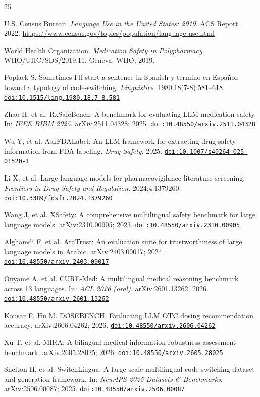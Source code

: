\documentclass[3p,times,procedia]{elsarticle}
\providecommand{\doi}[1]{\href{https://doi.org/#1}{\nolinkurl{doi:#1}}}
\begin{document}
\begin{thebibliography}{25}

  U.S. Census Bureau.
  \emph{Language Use in the United States: 2019}. ACS Report. 2022.
  \url{https://www.census.gov/topics/population/language-use.html}

  World Health Organization.
  \emph{Medication Safety in Polypharmacy}.
  WHO/UHC/SDS/2019.11. Geneva: WHO; 2019.

  Poplack S. Sometimes I'll start a sentence in Spanish y termino en
  Espa\~{n}ol: toward a typology of code-switching.
  \emph{Linguistics}. 1980;18(7-8):581--618.
  \doi{10.1515/ling.1980.18.7-8.581}

  Zhao H, et al.
  RxSafeBench: A benchmark for evaluating LLM medication safety.
  In: \emph{IEEE BIBM 2025}. arXiv:2511.04328; 2025.
  \doi{10.48550/arxiv.2511.04328}

  Wu Y, et al.
  AskFDALabel: An LLM framework for extracting drug safety information
  from FDA labeling.
  \emph{Drug Safety}. 2025.
  \doi{10.1007/s40264-025-01520-1}

  Li X, et al.
  Large language models for pharmacovigilance literature screening.
  \emph{Frontiers in Drug Safety and Regulation}. 2024;4:1379260.
  \doi{10.3389/fdsfr.2024.1379260}

  Wang J, et al.
  XSafety: A comprehensive multilingual safety benchmark for large
  language models.
  arXiv:2310.00905; 2023.
  \doi{10.48550/arxiv.2310.00905}

  Alghamdi F, et al.
  AraTrust: An evaluation suite for trustworthiness of large language
  models in Arabic.
  arXiv:2403.09017; 2024.
  \doi{10.48550/arxiv.2403.09017}

  Onyame A, et al.
  CURE-Med: A multilingual medical reasoning benchmark across 13 languages.
  In: \emph{ACL 2026 (oral)}. arXiv:2601.13262; 2026.
  \doi{10.48550/arxiv.2601.13262}

  Kousar F, Hu M.
  DOSEBENCH: Evaluating LLM OTC dosing recommendation accuracy.
  arXiv:2606.04262; 2026.
  \doi{10.48550/arxiv.2606.04262}

  Xu T, et al.
  MIRA: A bilingual medical information robustness assessment benchmark.
  arXiv:2605.28025; 2026.
  \doi{10.48550/arxiv.2605.28025}

  Shelton H, et al.
  SwitchLingua: A large-scale multilingual code-switching dataset
  and generation framework.
  In: \emph{NeurIPS 2025 Datasets \& Benchmarks}. arXiv:2506.00087; 2025.
  \doi{10.48550/arxiv.2506.00087}


\end{thebibliography}
\end{document}
